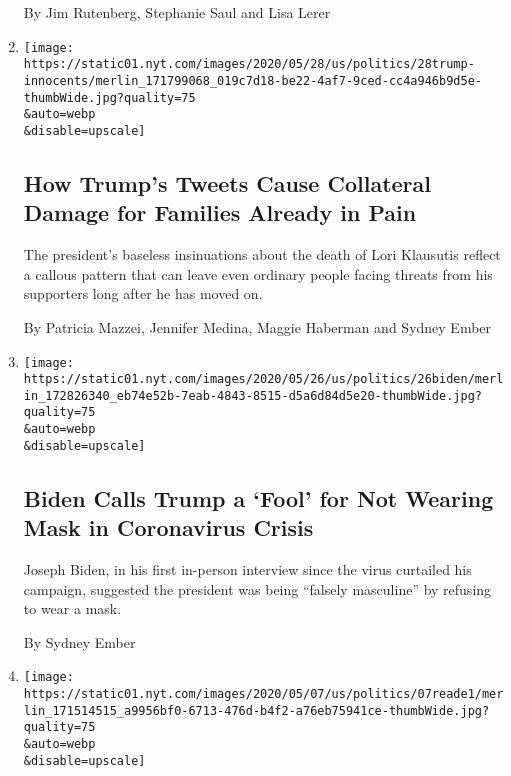 \begin{enumerate}
  By Jim Rutenberg, Stephanie Saul and Lisa Lerer
\item
  \href{/2020/05/29/us/politics/trump-scarborough-klausutis.html}{}

  \texttt{[image: https://static01.nyt.com/images/2020/05/28/us/politics/28trump-innocents/merlin\_171799068\_019c7d18-be22-4af7-9ced-cc4a946b9d5e-thumbWide.jpg?quality=75\\\&auto=webp\\\&disable=upscale]}

  \hypertarget{how-trumps-tweets-cause-collateral-damage-for-families-already-in-pain}{%
  \subsection{How Trump's Tweets Cause Collateral Damage for Families
  Already in
  Pain}\label{how-trumps-tweets-cause-collateral-damage-for-families-already-in-pain}}

  The president's baseless insinuations about the death of Lori
  Klausutis reflect a callous pattern that can leave even ordinary
  people facing threats from his supporters long after he has moved on.

  By Patricia Mazzei, Jennifer Medina, Maggie Haberman and Sydney Ember
\item
  \href{/2020/05/26/us/politics/joe-biden-facemasks-trump-coronavirus.html}{}

  \texttt{[image: https://static01.nyt.com/images/2020/05/26/us/politics/26biden/merlin\_172826340\_eb74e52b-7eab-4843-8515-d5a6d84d5e20-thumbWide.jpg?quality=75\\\&auto=webp\\\&disable=upscale]}

  \hypertarget{biden-calls-trump-a-fool-for-not-wearing-mask-in-coronavirus-crisis}{%
  \subsection{Biden Calls Trump a `Fool' for Not Wearing Mask in
  Coronavirus
  Crisis}\label{biden-calls-trump-a-fool-for-not-wearing-mask-in-coronavirus-crisis}}

  Joseph Biden, in his first in-person interview since the virus
  curtailed his campaign, suggested the president was being ``falsely
  masculine'' by refusing to wear a mask.

  By Sydney Ember
\item
  \href{/2020/05/07/us/politics/tara-reade-megyn-kelly-interview.html}{}

  \texttt{[image: https://static01.nyt.com/images/2020/05/07/us/politics/07reade1/merlin\_171514515\_a9956bf0-6713-476d-b4f2-a76eb75941ce-thumbWide.jpg?quality=75\\\&auto=webp\\\&disable=upscale]}


\end{enumerate}
